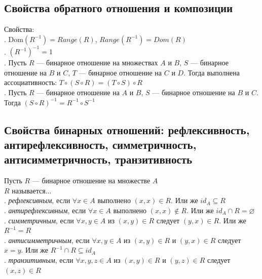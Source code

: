 \documentclass[a4paper]{article}
\begin{document}
\subsection{Свойства обратного отношения и композиции}
Свойства:\\[2mm]
. Dom$(R^{-1})=Range(R)$, $Range(R^{-1})=Dom(R)$\\[2mm]
. $(R^{-1})^{-1}=1$\\[2mm]
. Пусть $R$ — бинарное отношение на множествах $A$ и $B$, $S$ — бинарное отношение на $B$ и $C$, $T$ — бинарное отношение на $C$ и $D$. Тогда выполнена ассоциативность: $T\circ(S\circ R)=(T\circ S)\circ R$\\[2mm]
. Пусть $R$ — бинарное отношение на $A$ и $B$, $S$ — бинарное отношение на  $B$ и $C$. Тогда $(S\circ R)^{-1}=R^{-1}\circ S^{-1}$
\subsection{Свойства бинарных отношений: рефлексивность, антирефлексивность, симметричность, антисимметричность, транзитивность}
Пусть $R$ — бинарное отношение на множестве $A$\\[2mm]
$R$ называется...\\[2mm]
. \textit{рефлексивным}, если $\forall x\in A$ выполнено $(x, x)\in R$. Или же $id_A\subseteq R$\\[2mm]
. \textit{антирефлексивным}, если $\forall x\in A$ выполнено $(x, x)\notin R$. Или же $id_A\cap R=\varnothing$\\[2mm]
. \textit{симметричным}, если $\forall x, y\in A$ из $(x,y)\in R$ следует $(y, x)\in R$. Или же $R^{-1}=R$\\[2mm]
. \textit{антисимметричным}, если $\forall x, y\in A$ из $(x,y)\in R$  и $(y,x)\in R$ следует $x=y$. Или же $R^{-1}\cap R\subseteq id_A$\\[2mm]
. \textit{транзитивным}, если $\forall x, y, z\in A$ из $(x,y)\in R$  и $(y,z)\in R$ следует $(x, z)\in R$\\[2mm]
\end{document}
